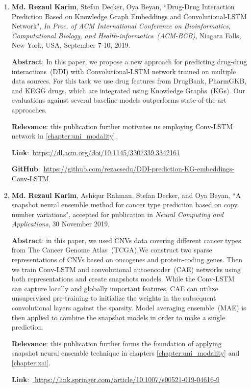 \begin{enumerate}
	\item \textbf{Md. Rezaul Karim}, Stefan Decker, Oya Beyan, ``Drug-Drug Interaction Prediction Based on Knowledge Graph Embeddings and Convolutional-LSTM Network", \emph{In Proc. of ACM International Conference on Bioinformatics, Computational Biology, and Health-informatics~(ACM-BCB)}, Niagara Falls, New York, USA, September 7-10, 2019.
	
	\textbf{Abstract}: In this paper, we propose a new approach for predicting drug-drug interactions~(DDI) with Convolutional-LSTM network trained on multiple data sources. For this task we use drug features from DrugBank, PharmGKB, and KEGG drugs, which are integrated using Knowledge Graphs~(KGs). Our evaluations against several baseline models outperforms state-of-the-art approaches. 
	
	\textbf{Relevance}: this publication further motivates us employing Conv-LSTM network in \cref{chapter:uni_modality}.
	
	\textbf{Link}:~\url{https://dl.acm.org/doi/10.1145/3307339.3342161}

	\textbf{GitHub}:~\url{https://github.com/rezacsedu/DDI-prediction-KG-embeddings-Conv-LSTM}
	
	\item \textbf{Md. Rezaul Karim}, Ashiqur Rahman, Stefan Decker, and Oya Beyan, ``A snapshot neural ensemble method for cancer type prediction based on copy number variations", accepted for publication in \emph{Neural Computing and Applications}, 30 November 2019. 
	
	\textbf{Abstract}: in this paper, we used CNVs data covering different cancer types from The Cancer Genome Atlas~(TCGA).We construct two sparse representations of CNVs based on oncogenes and protein-coding genes. Then we train Conv-LSTM and convolutional autoencoder~(CAE) networks using both representations and create snapshots models. While the Conv-LSTM can capture locally and globally important features, CAE can utilize unsupervised pre-training to initialize the weights in the subsequent convolutional layers against the sparsity. Model averaging ensemble~(MAE) is then applied to combine the snapshot models in order to make a single prediction. 
	
	\textbf{Relevance}: this publication further forms the foundation of applying snapshot neural ensemble technique in chapters \ref{chapter:uni_modality} and \ref{chapter:xai}.
	
	\textbf{Link}:~\url{	https://link.springer.com/article/10.1007/s00521-019-04616-9}
	

\end{enumerate}
